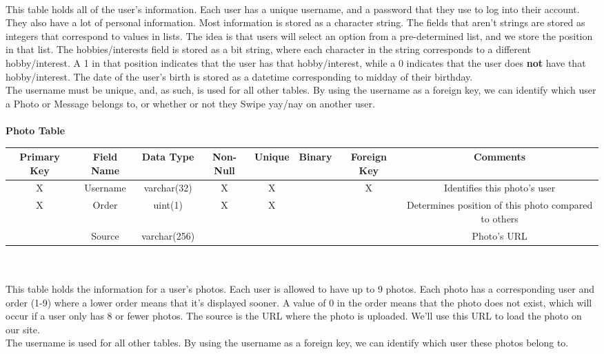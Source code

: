\documentclass{article}
\begin{document}
\begin{enumerate}
\begin{adjustbox}{width=1.2\textwidth}
        \end{adjustbox}\\
        This table holds all of the user's information. Each user has a unique username, and a password that they use to log into their account. They also have a lot of personal information. Most information is stored as a character string. The fields that aren't strings are stored as integers that correspond to values in lists. The idea is that users will select an option from a pre-determined list, and we store the position in that list. The hobbies/interests field is stored as a bit string, where each character in the string corresponds to a different hobby/interest. A 1 in that position indicates that the user has that hobby/interest, while a 0 indicates that the user does \textbf{not} have that hobby/interest. The date of the user's birth is stored as a datetime corresponding to midday of their birthday.\\
        The username must be unique, and, as such, is used for all other tables. By using the username as a foreign key, we can identify which user a Photo or Message belongs to, or whether or not they Swipe yay/nay on another user.\\\\
        
        \textbf{Photo Table}\\
        \begin{adjustbox}{width=1.2\textwidth}
            \begin{tabular}{|c|c|c|c|c|c|c|c|}
                \hline
                Primary Key & Field Name & Data Type & Non-Null & Unique & Binary & Foreign Key & Comments \\ \hline
                X & Username & varchar(32) & X & X &  & X & Identifies this photo's user\\ \hline
                X & Order & uint(1) & X & X &  &  & Determines position of this photo compared to others\\ \hline
                 & Source & varchar(256) &  &  &  &  & Photo's URL\\ \hline
            \end{tabular}
        \end{adjustbox}\\\\
        This table holds the information for a user's photos. Each user is allowed to have up to 9 photos. Each photo has a corresponding user and order (1-9) where a lower order means that it's displayed sooner. A value of 0 in the order means that the photo does not exist, which will occur if a user only has 8 or fewer photos. The source is the URL where the photo is uploaded. We'll use this URL to load the photo on our site.\\
        The username is used for all other tables. By using the username as a foreign key, we can identify which user these photos belong to.\\\\
        

\end{enumerate}
\end{document}
